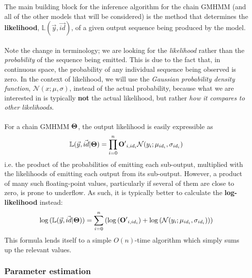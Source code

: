 \documentclass[12pt,a4paper,twoside,openright]{report}
\begin{document}
The main building block for the inference algorithm for the chain GMHMM (and all of the other models that will be considered) is the method that determines the {\bf likelihood}, $\mathbb{L}(\vec{y}, \vec{id})$, of a given output sequence being produced by the model.\\ \\
Note the change in terminology; we are looking for the \emph{likelihood} rather than the \emph{probability} of the sequence being emitted. This is due to the fact that, in continuous space, the probability of any individual sequence being observed is zero. In the context of likelihood, we will use the \emph{Gaussian probability density function}, $\mathcal{N}(x; \mu, \sigma)$, instead of the actual probability, because what we are interested in is typically {\bf not} the actual likelihood, but rather \emph{how it compares to other likelihoods}.\\ \\
For a chain GMHMM $\bf \Theta$, the output likelihood is easily expressible as
\[\mathbb{L}(\vec{y}, \vec{id}|{\bf \Theta}) = \prod_{i=0}^{n}{{\bf O'}_{i, id_i} \mathcal{N}(y_i; \mu_{id_i}, \sigma_{id_i})}\]
i.e.\! the product of the probabilities of emitting each sub-output, multiplied with the likelihoods of emitting each output from its sub-output. However, a product of many such floating-point values, particularly if several of them are close to zero, is prone to underflow. As such, it is typically better to calculate the {\bf log-likelihood} instead:
\[\log{(\mathbb{L}(\vec{y}, \vec{id}|{\bf \Theta}))} = \sum_{i=0}^{n}{(\log{({\bf O'}_{i, id_i})} +  \log{(\mathcal{N}(y_i; \mu_{id_i}, \sigma_{id_i}))})}\]
This formula lends itself to a simple $O(n)$-time algorithm which simply sums up the relevant values.

\subsubsection{Parameter estimation}\label{secparest}
\end{document}
